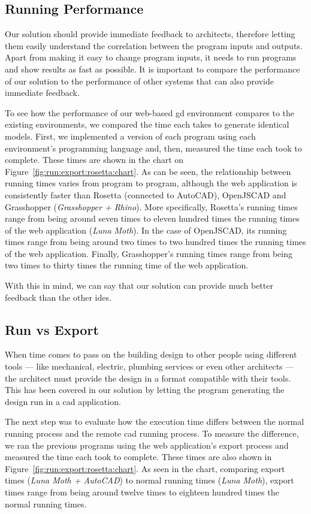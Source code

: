 \subsection{Running Performance}
Our solution should provide immediate feedback to architects, therefore letting them easily understand the correlation between the program inputs and outputs\cite{Leitao2014illustrated}.
Apart from making it easy to change program inputs, it needs to run programs and show results as fast as possible.
It is important to compare the performance of our solution to the performance of other systems that can also provide immediate feedback.

To see how the performance of our web-based \gls{gd} environment compares to the existing environments, we compared the time each takes to generate identical models.
First, we implemented a version of each program using each environment's programming language and, then, measured the time each took to complete.
These times are shown in the chart on Figure~\ref{fig:run:export:rosetta:chart}.
As can be seen, the relationship between running times varies from program to program, although the web application is consistently faster than Rosetta (connected to AutoCAD), OpenJSCAD and Grasshopper (\textit{Grasshopper + Rhino}).
More specifically, Rosetta's running times range from being around seven times to eleven hundred times the running times of the web application (\textit{Luna Moth}).
In the case of OpenJSCAD, its running times range from being around two times to two hundred times the running times of the web application.
Finally, Grasshopper's running times range from being two times to thirty times the running time of the web application.

With this in mind, we can say that our solution can provide much better feedback than the other \glspl{ide}.


\subsection{Run vs Export}
\label{sec:eval:export}
When time comes to pass on the building design to other people using different tools --- like mechanical, electric, plumbing services or even other architects --- the architect must provide the design in a format compatible with their tools.
This has been covered in our solution by letting the program generating the design run in a \gls{cad} application.

The next step was to evaluate how the execution time differs between the normal running process and the remote \gls{cad} running process.
To measure the difference, we ran the previous programs using the web application's export process and measured the time each took to complete.
These times are also shown in Figure~\ref{fig:run:export:rosetta:chart}.
As seen in the chart, comparing export times (\textit{Luna Moth + AutoCAD}) to normal running times (\textit{Luna Moth}), export times range from being around twelve times to eighteen hundred times the normal running times.

